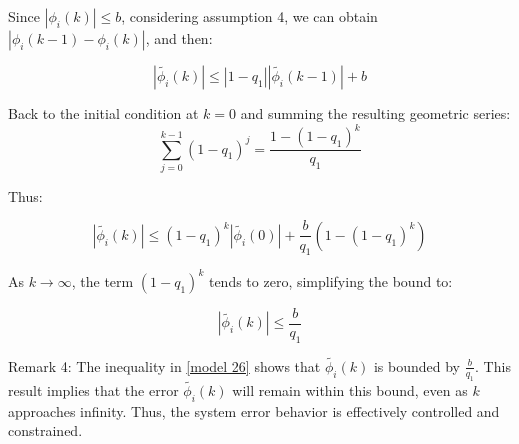 \documentclass[journal,onecolumn]{IEEEtran}
\begin{document}

Since $|\phi_i(k)| \leq b $, considering assumption 4, we can obtain $|\phi_i(k-1)-\phi_i(k)|$, and then:

\begin{equation}
\label{model 23}
|\tilde{\phi_i}(k)| \leq |1 - q_1| |\tilde{\phi_i}(k-1)| + b
\end{equation}



Back to the initial condition at \(k=0\) and summing the resulting geometric series:
\[
\sum_{j=0}^{k-1} (1-q_1)^j = \frac{1-(1-q_1)^k}{q_1}
\]

Thus:

\begin{equation}
\label{model 25}
|\tilde{\phi_i}(k)| \leq (1 - q_1)^k |\tilde{\phi_i}(0)| + \frac{b}{q_1} (1 - (1 - q_1)^k)
\end{equation}

As \(k \rightarrow \infty\), the term \((1-q_1)^k\) tends to zero, simplifying the bound to:

\begin{equation}
\label{model 26}
|\tilde{\phi_i}(k)| \leq \frac{b}{q_1}
\end{equation}



Remark 4: The inequality in \eqref{model 26} shows that \(\tilde{\phi_i}(k)\) is bounded by \(\frac{b}{q_1}\). This result implies that the error \(\tilde{\phi_i}(k)\) will remain within this bound, even as \(k\) approaches infinity. Thus, the system error behavior is effectively controlled and constrained.

    


\end{document}

